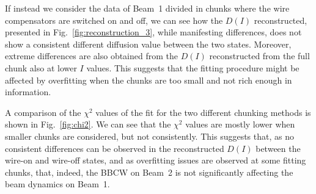 
If instead we consider the data of Beam~1 divided in chunks where the wire compensators are switched on and off, we can see how the $D(I)$ reconstructed, presented in Fig.~\ref{fig:reconstruction_3}, while manifesting differences, does not show a consistent different diffusion value between the two states. Moreover, extreme differences are also obtained from the $D(I)$ reconstructed from the full chunk also at lower $I$ values. This suggests that the fitting procedure might be affected by overfitting when the chunks are too small and not rich enough in information.

A comparison of the $\chi^2$ values of the fit for the two different chunking methods is shown in Fig.~\ref{fig:chi2}. We can see that the $\chi^2$ values are mostly lower when smaller chunks are considered, but not consistently. This suggests that, as no consistent differences can be observed in the reconstructed $D(I)$ between the wire-on and wire-off states, and as overfitting issues are observed at some fitting chunks, that, indeed, the BBCW on Beam~2 is not significantly affecting the beam dynamics on Beam~1.


